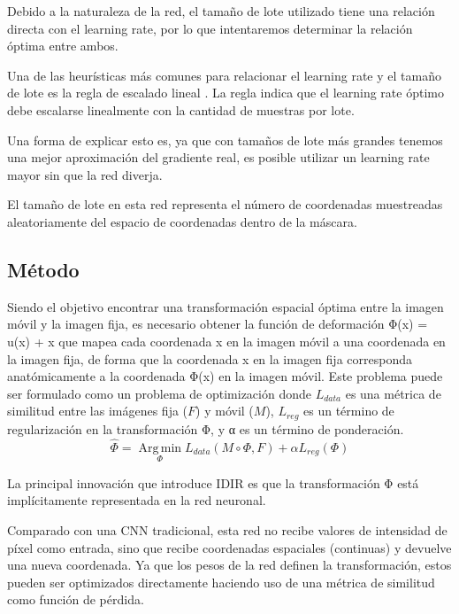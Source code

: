 Debido a la naturaleza de la red, el tamaño de lote utilizado tiene una relación directa con el learning rate, por lo que intentaremos determinar la relación óptima entre ambos.

Una de las heurísticas más comunes para relacionar el learning rate y el tamaño de lote es la regla de escalado lineal \cite{goyal2018accuratelargeminibatchsgd}.
La regla indica que el learning rate óptimo debe escalarse linealmente con la cantidad de muestras por lote.

Una forma de explicar esto es, ya que con tamaños de lote más grandes tenemos una mejor aproximación del gradiente real, es posible utilizar un learning rate mayor sin que la red diverja. \cite{kexuefm}

El tamaño de lote en esta red representa el número de coordenadas muestreadas aleatoriamente del espacio de coordenadas dentro de la máscara.

\subsection{Método}\label{subsubsec:Método}

Siendo el objetivo encontrar una transformación espacial óptima entre la imagen móvil y la imagen fija,
es necesario obtener la función de deformación Φ(x) = u(x) + x que mapea cada coordenada x en la imagen móvil a una coordenada en la imagen fija,
de forma que la coordenada x en la imagen fija corresponda anatómicamente a la coordenada Φ(x) en la imagen móvil.
Este problema puede ser formulado como un problema de optimización donde $L_{data}$ es una métrica de similitud entre las imágenes fija ($F$) y móvil ($M$), $L_{reg}$ es un término de regularización en la transformación Φ, y α es un término de ponderación.
\begin{equation}
    \hat{\Phi} = \operatorname*{Arg\,min}_{\Phi} L_{data}(M \circ \Phi, F) + \alpha L_{reg}(\Phi)
\end{equation}

La principal innovación que introduce IDIR\cite{wolterink2021implicit} es que la transformación Φ está implícitamente representada en la red neuronal.

Comparado con una CNN tradicional, esta red no recibe valores de intensidad de píxel como entrada,
sino que recibe coordenadas espaciales (continuas) y devuelve una nueva coordenada.
Ya que los pesos de la red definen la transformación, estos pueden ser optimizados directamente
haciendo uso de una métrica de similitud como función de pérdida.

